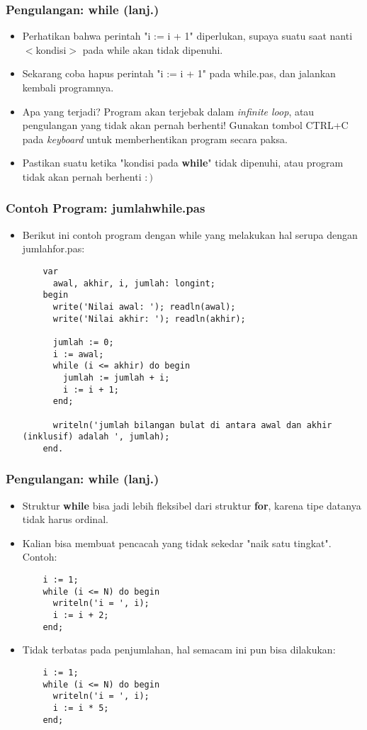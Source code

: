 \begin{frame}
\frametitle{Pengulangan: while (lanj.)}
\begin{itemize}
  \item Perhatikan bahwa perintah "i := i + 1" diperlukan, supaya suatu saat nanti $<$kondisi$>$ pada while akan tidak dipenuhi.
  \item Sekarang coba hapus perintah "i := i + 1" pada while.pas, dan jalankan kembali programnya.
  \item Apa yang terjadi? Program akan terjebak dalam \alert{\textit{infinite loop}}, atau \alert{pengulangan yang tidak akan pernah berhenti}! Gunakan tombol CTRL+C pada \textit{keyboard} untuk memberhentikan program secara paksa.
  \item Pastikan suatu ketika "kondisi pada \textbf{while}" tidak dipenuhi, atau program tidak akan pernah berhenti $:)$
\end{itemize}
\end{frame}

\begin{frame}[fragile]
\frametitle{Contoh Program: jumlahwhile.pas}
\begin{itemize}
  \item Berikut ini contoh program dengan while yang melakukan hal serupa dengan jumlahfor.pas:
  \begin{lstlisting}
    var
      awal, akhir, i, jumlah: longint;
    begin
      write('Nilai awal: '); readln(awal);
      write('Nilai akhir: '); readln(akhir);

      jumlah := 0;
      i := awal;
      while (i <= akhir) do begin
        jumlah := jumlah + i;
        i := i + 1;
      end;

      writeln('jumlah bilangan bulat di antara awal dan akhir (inklusif) adalah ', jumlah);
    end.
  \end{lstlisting}
\end{itemize}
\end{frame}

\begin{frame}[fragile]
\frametitle{Pengulangan: while (lanj.)}
\begin{itemize}
  \item Struktur \textbf{while} bisa jadi lebih fleksibel dari struktur \textbf{for}, karena tipe datanya tidak harus ordinal.
  \item Kalian bisa membuat pencacah yang tidak sekedar "naik satu tingkat". Contoh:
  \begin{lstlisting}
    i := 1;
    while (i <= N) do begin
      writeln('i = ', i);
      i := i + 2;
    end;
  \end{lstlisting}

  \item Tidak terbatas pada penjumlahan, hal semacam ini pun bisa dilakukan:
  \begin{lstlisting}
    i := 1;
    while (i <= N) do begin
      writeln('i = ', i);
      i := i * 5;
    end;
  \end{lstlisting}
\end{itemize}
\end{frame}

